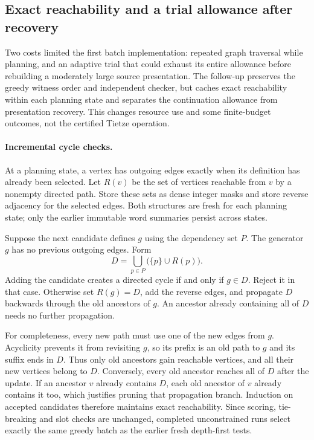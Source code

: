 \subsection{Exact reachability and a trial allowance after recovery}
\label{sec:elimination-reach}

Two costs limited the first batch implementation: repeated graph traversal
while planning, and an adaptive trial that could exhaust its entire allowance
before rebuilding a moderately large source presentation. The follow-up
preserves the greedy witness order and independent checker, but caches exact
reachability within each planning state and separates the continuation
allowance from presentation recovery. This changes resource use and some
finite-budget outcomes, not the certified Tietze operation.

\paragraph{Incremental cycle checks.}
At a planning state, a vertex has outgoing edges exactly when its definition
has already been selected. Let $R(v)$ be the set of vertices reachable from
$v$ by a nonempty directed path. Store these sets as dense integer masks and
store reverse adjacency for the selected edges. Both structures are fresh
for each planning state; only the earlier immutable word summaries persist
across states.

Suppose the next candidate defines $g$ using the dependency set $P$.
The generator $g$ has no previous outgoing edges. Form
\[
 D=\bigcup_{p\in P}\bigl(\{p\}\cup R(p)\bigr).
\]
Adding the candidate creates a directed cycle if and only if $g\in D$.
Reject it in that case. Otherwise set $R(g)=D$, add the reverse edges,
and propagate $D$ backwards through the old ancestors of $g$. An ancestor
already containing all of $D$ needs no further propagation.

For completeness, every new path must use one of the new edges from $g$.
Acyclicity prevents it from revisiting $g$, so its prefix is an old path to
$g$ and its suffix ends in $D$. Thus only old ancestors gain reachable
vertices, and all their new vertices belong to $D$. Conversely, every old
ancestor reaches all of $D$ after the update. If an ancestor $v$ already
contains $D$, each old ancestor of $v$ already contains it too, which
justifies pruning that propagation branch. Induction on accepted candidates
therefore maintains exact reachability. Since scoring, tie-breaking and
slot checks are unchanged, completed unconstrained runs select exactly the
same greedy batch as the earlier fresh depth-first tests.

